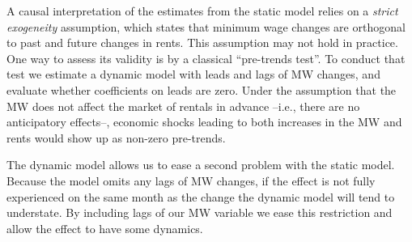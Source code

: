A causal interpretation of the estimates from the static model relies on a \textit{strict 
exogeneity} assumption, which states that minimum wage changes are orthogonal to past and 
future changes in rents. This assumption may not hold in practice. One way to assess its 
validity is by a classical ``pre-trends test''. To conduct that test we estimate a dynamic 
model with leads and lags of MW changes, and evaluate whether coefficients on leads are zero. 
Under the assumption that the MW does not affect the market of rentals in advance --i.e., there
are no anticipatory effects--, economic shocks leading to both increases in the MW and rents 
would show up as non-zero pre-trends. 

The dynamic model allows us to ease a second problem with the static model. Because the model
omits any lags of MW changes, if the effect is not fully experienced on the same month as the 
change the dynamic model will tend to understate. By including lags of our MW variable we ease
this restriction and allow the effect to have some dynamics.

